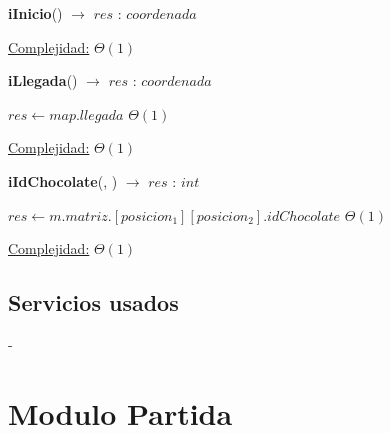 \documentclass[10pt, a4paper]{article}
\begin{document}
\begin{Algoritmos}
\begin{algorithm}[H]{\textbf{iInicio}() $\to$ $res$ : $coordenada$}
\begin{algorithmic}[1]
                    \medskip
                    \Statex \underline{Complejidad:} $\Theta(1)$
                \end{algorithmic}
        \end{algorithm}
        
        \begin{algorithm}[H]{\textbf{iLlegada}() $\to$ $res$ : $coordenada$}
            \begin{algorithmic}[1]
                    \State $res \gets map.llegada$                                                                \Comment $\Theta(1)$
    
                    \medskip
                    \Statex \underline{Complejidad:} $\Theta(1)$
                \end{algorithmic}
        \end{algorithm}
        
        
        \begin{algorithm}[H]{\textbf{iIdChocolate}(, ) $\to$ $res$ : $int$}
            \begin{algorithmic}[1]
                \State $res \gets m.matriz.[posicion_1][posicion_2].idChocolate$                                    \Comment $\Theta(1)$

                \medskip
                \Statex \underline{Complejidad:} $\Theta(1)$
            \end{algorithmic}
        \end{algorithm}

    \end{Algoritmos}

    \subsection*{Servicios usados}

        -

    \newpage

    \section*{Modulo Partida}
\end{document}
